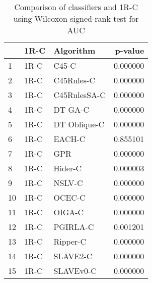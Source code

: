 \begin{table}
\footnotesize
\caption{Comparison of classifiers and 1R-C using Wilcoxon signed-rank test for AUC}
\label{tab:1R-C wilcoxon AUC comparison}
\begin{tabular}{lllr}
\hline
 & 1R-C & Algorithm & p-value \\
\hline
1 & 1R-C & C45-C & 0.000000 \\
2 & 1R-C & C45Rules-C & 0.000000 \\
3 & 1R-C & C45RulesSA-C & 0.000000 \\
4 & 1R-C & DT GA-C & 0.000000 \\
5 & 1R-C & DT Oblique-C & 0.000000 \\
6 & 1R-C & EACH-C & 0.855101 \\
7 & 1R-C & GPR & 0.000000 \\
8 & 1R-C & Hider-C & 0.000003 \\
9 & 1R-C & NSLV-C & 0.000000 \\
10 & 1R-C & OCEC-C & 0.000000 \\
11 & 1R-C & OIGA-C & 0.000000 \\
12 & 1R-C & PGIRLA-C & 0.001201 \\
13 & 1R-C & Ripper-C & 0.000000 \\
14 & 1R-C & SLAVE2-C & 0.000000 \\
15 & 1R-C & SLAVEv0-C & 0.000000 \\
\hline
\end{tabular}
\end{table}
